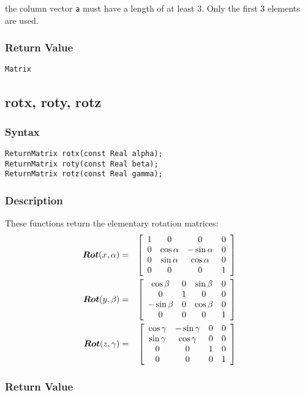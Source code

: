 \documentclass[11pt,fleqn,letterpaper]{report}
\newcommand{\mbold}[1]{\mbox{\boldmath $ #1 $}}
\newcommand{\matr}[2]{\left[\begin{array}{#1} #2 \end{array}\right]}
\begin{document}
 the column vector {\tt a} must have a length of at least 3. 
Only the first 3 elements are used.

\subsubsection*{Return Value}

{\tt Matrix}

\newpage

\subsection*{rotx, roty, rotz}

\subsubsection*{Syntax}
\begin{verbatim}
ReturnMatrix rotx(const Real alpha);
ReturnMatrix roty(const Real beta);
ReturnMatrix rotz(const Real gamma);
\end{verbatim}
\subsubsection*{Description}
These functions return the elementary rotation matrices:
\begin{eqnarray}
\mbold{Rot}(x,\alpha) & = & 
\matr{cccc}{
1 & 0 & 0 & 0 \\
0 & \cos \alpha & - \sin \alpha & 0 \\
0 & \sin \alpha & \cos \alpha & 0 \\
0 & 0 & 0 & 1
} \\
\mbold{Rot}(y,\beta) & = & 
\matr{cccc}{
\cos \beta & 0 & \sin \beta & 0\\
0 & 1 & 0 & 0 \\
- \sin \beta & 0 & \cos \beta & 0 \\
0 & 0 & 0 & 1
} \\
\mbold{Rot}(z,\gamma) & = & 
\matr{cccc}{
\cos \gamma & - \sin \gamma & 0 & 0 \\
\sin \gamma & \cos \gamma & 0 & 0 \\
0 & 0 & 1 & 0 \\
0 & 0 & 0 & 1
}
\end{eqnarray}


\subsubsection*{Return Value}
\end{document}
